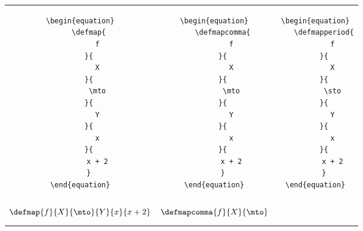 \begin{widepar}
    \begin{tabular}{|c|c|c|}%
        \hline
        \begin{minipage}{0.3\textwidth}
            \begin{verbatim}
\begin{equation}
    \defmap{
        f
    }{
        X
    }{
        \mto
    }{
        Y
    }{
        x
    }{
        x + 2
    }
\end{equation}
            \end{verbatim}
        \end{minipage}
         &
        \begin{minipage}{0.3\textwidth}
            \begin{verbatim}
\begin{equation}
    \defmapcomma{
        f
    }{
        X
    }{
        \mto
    }{
        Y
    }{
        x
    }{
        x + 2
    }
\end{equation}
            \end{verbatim}
        \end{minipage}
         &
        \begin{minipage}{0.3\textwidth}
            \begin{verbatim}
\begin{equation}
    \defmapperiod{
        f
    }{
        X
    }{
        \sto
    }{
        Y
    }{
        x
    }{
        x + 2
    }
\end{equation}
            \end{verbatim}
        \end{minipage}
        \\
        \begin{minipage}{0.3\textwidth}
            \begin{equation}
                \defmap{
                    f
                }{
                    X
                }{
                    \mto
                }{
                    Y
                }{
                    x
                }{
                    x + 2
                }
            \end{equation}
        \end{minipage}
         &
        \begin{minipage}{0.3\textwidth}
            \begin{equation}
                \defmapcomma{
                    f
                }{
                    X
                }{
                    \mto
}
\end{equation}
\end{minipage}
\end{tabular}
\end{widepar}
